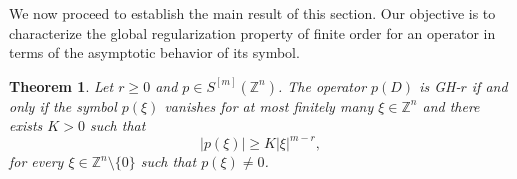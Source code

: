 \documentclass[11pt]{amsart}
\numberwithin{equation}{section}
\newtheorem{theorem}{Theorem}[section]
\theoremstyle{definition}
\begin{document}
	
	We now proceed to establish the main result of this section. Our objective is to characterize the global regularization property of finite order for an operator in terms of the asymptotic behavior of its symbol.



	\begin{theorem}\label{theoGH}
		Let \( r \geq 0 \) and \( p \in S^{[m]}(\mathbb{Z}^n) \). The operator \( p(D) \) is GH-\( r \) if and only if 
		the symbol \( p(\xi) \) vanishes for at most finitely many \( \xi \in \mathbb{Z}^n \) and there exists $K>0$ such that 
		\begin{equation}\label{ineq-GH}
			 |p(\xi)|\geq K|\xi|^{m-r},
		\end{equation}
		for every \( \xi \in \mathbb{Z}^n \setminus \{0\} \) such that \( p(\xi) \neq 0 \).
	\end{theorem}
\end{document}
